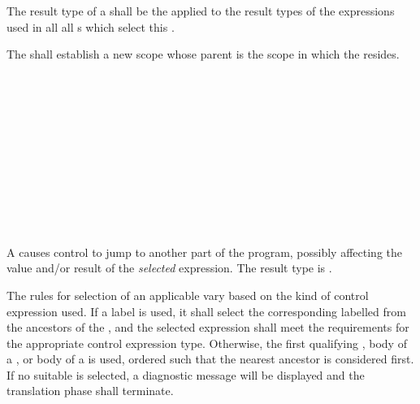 \specsubsubitem
The result type of a  shall be the
 applied to the result types of the
expressions used in all all s which select this
.


\specsubsubitem
The  shall establish a new scope whose parent is
the scope in which the  resides.


\begin{grammar}
 \\
	  \\
	  \\
	  \\
	 \\

 \\
	 \\
	  \\
	  \\
	  \terminal{,}  \\
\end{grammar}

\specsubsubitem
A  causes control to jump to another part of the
program, possibly affecting the value and/or result of the \textit{selected}
expression. The result type is .

\specsubsubitem
The rules for selection of an applicable  vary based on
the kind of control expression used. If a label is used, it shall select the
corresponding labelled  from the ancestors of
the , and the selected expression shall meet the
requirements for the appropriate control expression type. Otherwise, the first
qualifying , body of a ,
or body of a  is used, ordered such that the
nearest ancestor is considered first. If no suitable  is
selected, a diagnostic message will be displayed and the translation phase shall
terminate.

